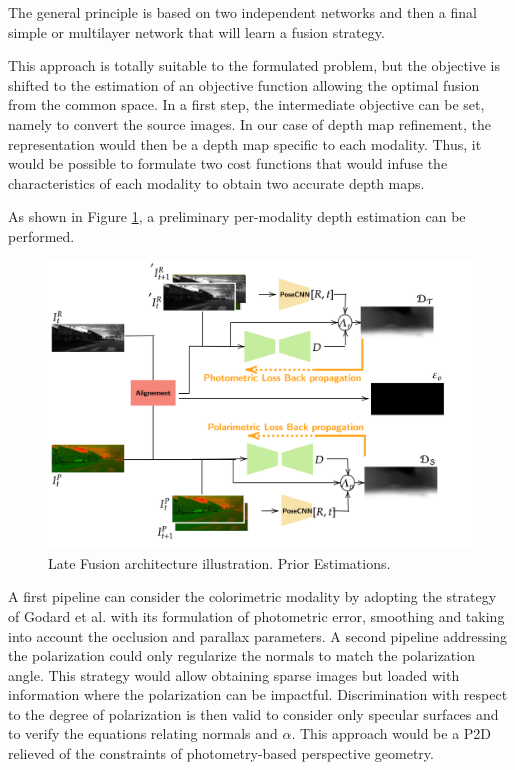 The general principle is based on two independent networks and then a final simple or multilayer network that will learn a fusion strategy.

This approach is totally suitable to the formulated problem, but the objective is shifted to the estimation of an objective function allowing the optimal fusion from the common space. In a first step, the intermediate objective can be set, namely to convert the source images.
In our case of depth map refinement, the representation would then be a depth map specific to each modality. Thus, it would be possible to formulate two cost functions that would infuse the characteristics of each modality to obtain two accurate depth maps.

As shown in Figure \ref{fig:late1}, a preliminary per-modality depth estimation can be performed.

\begin{figure}[h]
	\centering
	\includegraphics[width=0.8\linewidth]{Figures/Fusion/late1}
	\caption[Late Fusion architecture illustration. Prior Estimations.]{Late Fusion architecture illustration. Prior Estimations.}
	\label{fig:late1}
\end{figure}


A first pipeline can consider the colorimetric modality by adopting the strategy of Godard et al. with its formulation of photometric error, smoothing and taking into account the occlusion and parallax parameters.
A second pipeline addressing the polarization could only regularize the normals to match the polarization angle. This strategy would allow obtaining sparse images but loaded with information where the polarization can be impactful. Discrimination with respect to the degree of polarization is then valid to consider only specular surfaces and to verify the equations relating normals and $\alpha$. This approach would be a P2D relieved of the constraints of photometry-based perspective geometry.

